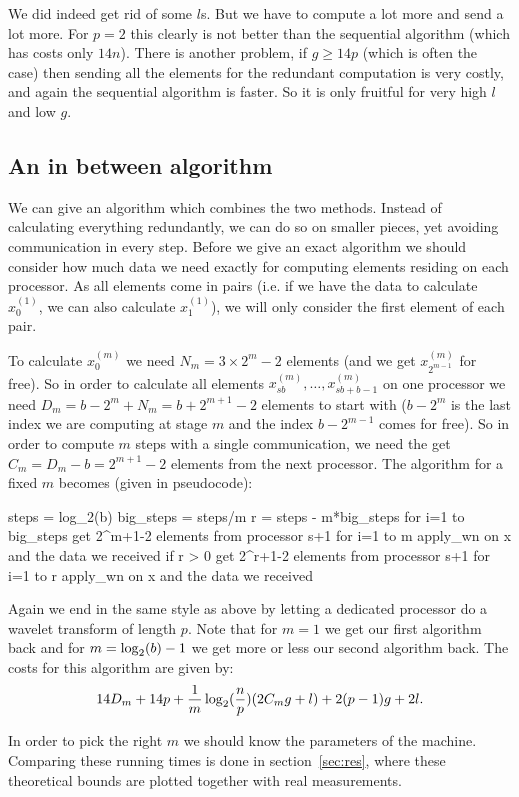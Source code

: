 We did indeed get rid of some $l$s. But we have to compute a lot more and send a lot more. For $p=2$ this clearly is not better than the sequential algorithm (which has costs only $14n$). There is another problem, if $g \geq 14p$ (which is often the case) then sending all the elements for the redundant computation is very costly, and again the sequential algorithm is faster. So it is only fruitful for very high $l$ and low $g$.


\subsection{An in between algorithm}
We can give an algorithm which combines the two methods. Instead of calculating everything redundantly, we can do so on smaller pieces, yet avoiding communication in every step. Before we give an exact algorithm we should consider how much data we need exactly for computing elements residing on each processor. As all elements come in pairs (i.e. if we have the data to calculate $x^{(1)}_0$, we can also calculate $x^{(1)}_1$), we will only consider the first element of each pair.

To calculate $x^{(m)}_0$ we need $N_m = 3 \times 2^m-2$ elements (and we get $x^{(m)}_{2^{m-1}}$ for free). So in order to calculate all elements $x^{(m)}_{sb}, \ldots, x^{(m)}_{sb+b-1}$ on one processor we need $D_m = b - 2^m + N_m = b + 2^{m+1} - 2$ elements to start with ($b-2^m$ is the last index we are computing at stage $m$ and the index $b - 2^{m-1}$ comes for free). So in order to compute $m$ steps with a single communication, we need the get $C_m = D_m - b = 2^{m+1} - 2$ elements from the next processor. The algorithm for a fixed $m$ becomes (given in pseudocode):

\begin{lstlistings}
steps = log_2(b)
big_steps = steps/m
r = steps - m*big_steps
for i=1 to big_steps
	get 2^{m+1}-2 elements from processor s+1
	for i=1 to m
		apply_wn on x and the data we received
if r > 0
	get 2^{r+1}-2 elements from processor s+1
	for i=1 to r
		apply_wn on x and the data we received
\end{lstlistings}

Again we end in the same style as above by letting a dedicated processor do a wavelet transform of length $p$. Note that for $m=1$ we get our first algorithm back and for $m = \operatorname{\log_2}(b)-1$ we get more or less our second algorithm back. The costs for this algorithm are given by:
\[ 14D_m + 14p + \frac{1}{m}\operatorname{\log_2}(\frac{n}{p})(2C_mg+l) + 2(p-1)g + 2l. \]

In order to pick the right $m$ we should know the parameters of the machine. Comparing these running times is done in section~\ref{sec:res}, where these theoretical bounds are plotted together with real measurements.
